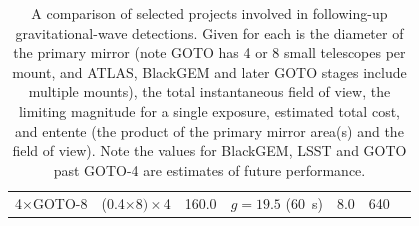 \begin{colsection}
\begin{table}[t]
\begin{center}
\begin{tabular}{r|cccccl}
            4$\times$GOTO-8 & (0.4$\times$8$)\times$4 & 160.0 & $g=19.5$ (\SI{60}{\second}) & 8.0 & 640 \\
        \end{tabular}
    \end{center}
    \caption[Comparison of projects involved in gravitational-wave follow-up]{
        A comparison of selected projects involved in following-up gravitational-wave detections. Given for each is the diameter of the primary mirror (note GOTO has 4 or 8 small telescopes per mount, and ATLAS, BlackGEM and later GOTO stages include multiple mounts), the total instantaneous field of view, the limiting magnitude for a single exposure, estimated total cost, and entente (the product of the primary mirror area(s) and the field of view). Note the values for BlackGEM, LSST and GOTO past GOTO-4 are estimates of future performance. %
    }\label{tab:rivals}
\end{table}

\end{colsection}


